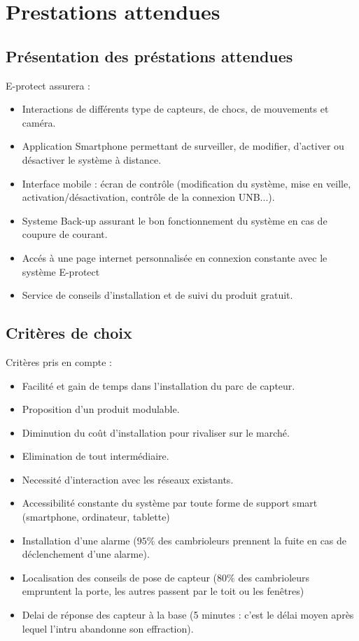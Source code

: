 \chapter{Prestations attendues}

\section{Présentation des préstations attendues}
E-protect assurera :
\begin{itemize}
\item Interactions de différents type de capteurs, de chocs, de mouvements et caméra.
\item Application Smartphone permettant de surveiller, de modifier, d’activer ou désactiver le système à distance.
\item Interface mobile : écran de contrôle (modification du système, mise en veille, activation/désactivation, contrôle de la connexion UNB...).
\item Systeme Back-up assurant le bon fonctionnement du système en cas de coupure de courant.
\item Accés à une page internet personnalisée en connexion constante avec le système E-protect
\item Service de conseils d'installation et de suivi du produit gratuit.\\
\end{itemize}

\section{Critères de choix}
Critères pris en compte :
\begin{itemize}
\item Facilité et gain de temps dans l'installation du parc de capteur.
\item Proposition d'un produit modulable.
\item Diminution du coût d'installation pour rivaliser sur le marché.
\item Elimination de tout intermédiaire.
\item Necessité d'interaction avec les réseaux existants.
\item Accessibilité constante du système par toute forme de support smart (smartphone, ordinateur, tablette) 
\item Installation d'une alarme ($95\%$ des cambrioleurs prennent la fuite en cas de déclenchement d’une alarme).
\item Localisation des conseils de pose de capteur ($80\%$ des cambrioleurs empruntent la porte, les autres passent par le toit ou les fenêtres)
\item Delai de réponse des capteur à la base (5 minutes : c'est le délai moyen après lequel l'intru abandonne son effraction).\\
\end{itemize}




